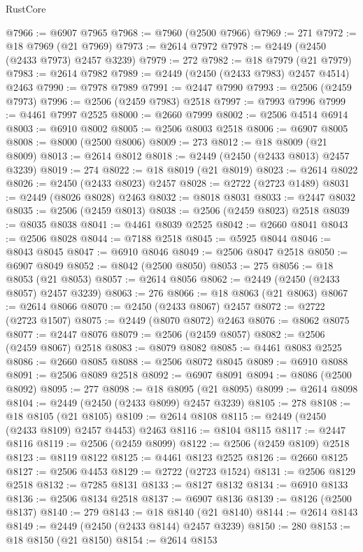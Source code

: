 \begin{lexlean}{RustCore}
\begin{coremodule}
@7966 := @6907 @7965
@7968 := @7960 (@2500 @7966)
@7969 := 271
@7972 := @18 @7969 (@21 @7969)
@7973 := @2614 @7972
@7978 := @2449 (@2450 (@2433 @7973) @2457 @3239)
@7979 := 272
@7982 := @18 @7979 (@21 @7979)
@7983 := @2614 @7982
@7989 := @2449 (@2450 (@2433 @7983) @2457 @4514) @2463
@7990 := @7978 @7989
@7991 := @2447 @7990
@7993 := @2506 (@2459 @7973)
@7996 := @2506 (@2459 @7983) @2518
@7997 := @7993 @7996
@7999 := @4461 @7997 @2525
@8000 := @2660 @7999
@8002 := @2506 @4514 @6914
@8003 := @6910 @8002
@8005 := @2506 @8003 @2518
@8006 := @6907 @8005
@8008 := @8000 (@2500 @8006)
@8009 := 273
@8012 := @18 @8009 (@21 @8009)
@8013 := @2614 @8012
@8018 := @2449 (@2450 (@2433 @8013) @2457 @3239)
@8019 := 274
@8022 := @18 @8019 (@21 @8019)
@8023 := @2614 @8022
@8026 := @2450 (@2433 @8023) @2457
@8028 := @2722 (@2723 @1489)
@8031 := @2449 (@8026 @8028) @2463
@8032 := @8018 @8031
@8033 := @2447 @8032
@8035 := @2506 (@2459 @8013)
@8038 := @2506 (@2459 @8023) @2518
@8039 := @8035 @8038
@8041 := @4461 @8039 @2525
@8042 := @2660 @8041
@8043 := @2506 @8028
@8044 := @7188 @2518
@8045 := @5925 @8044
@8046 := @8043 @8045
@8047 := @6910 @8046
@8049 := @2506 @8047 @2518
@8050 := @6907 @8049
@8052 := @8042 (@2500 @8050)
@8053 := 275
@8056 := @18 @8053 (@21 @8053)
@8057 := @2614 @8056
@8062 := @2449 (@2450 (@2433 @8057) @2457 @3239)
@8063 := 276
@8066 := @18 @8063 (@21 @8063)
@8067 := @2614 @8066
@8070 := @2450 (@2433 @8067) @2457
@8072 := @2722 (@2723 @1507)
@8075 := @2449 (@8070 @8072) @2463
@8076 := @8062 @8075
@8077 := @2447 @8076
@8079 := @2506 (@2459 @8057)
@8082 := @2506 (@2459 @8067) @2518
@8083 := @8079 @8082
@8085 := @4461 @8083 @2525
@8086 := @2660 @8085
@8088 := @2506 @8072 @8045
@8089 := @6910 @8088
@8091 := @2506 @8089 @2518
@8092 := @6907 @8091
@8094 := @8086 (@2500 @8092)
@8095 := 277
@8098 := @18 @8095 (@21 @8095)
@8099 := @2614 @8098
@8104 := @2449 (@2450 (@2433 @8099) @2457 @3239)
@8105 := 278
@8108 := @18 @8105 (@21 @8105)
@8109 := @2614 @8108
@8115 := @2449 (@2450 (@2433 @8109) @2457 @4453) @2463
@8116 := @8104 @8115
@8117 := @2447 @8116
@8119 := @2506 (@2459 @8099)
@8122 := @2506 (@2459 @8109) @2518
@8123 := @8119 @8122
@8125 := @4461 @8123 @2525
@8126 := @2660 @8125
@8127 := @2506 @4453
@8129 := @2722 (@2723 @1524)
@8131 := @2506 @8129 @2518
@8132 := @7285 @8131
@8133 := @8127 @8132
@8134 := @6910 @8133
@8136 := @2506 @8134 @2518
@8137 := @6907 @8136
@8139 := @8126 (@2500 @8137)
@8140 := 279
@8143 := @18 @8140 (@21 @8140)
@8144 := @2614 @8143
@8149 := @2449 (@2450 (@2433 @8144) @2457 @3239)
@8150 := 280
@8153 := @18 @8150 (@21 @8150)
@8154 := @2614 @8153

\end{coremodule}
\end{lexlean}

